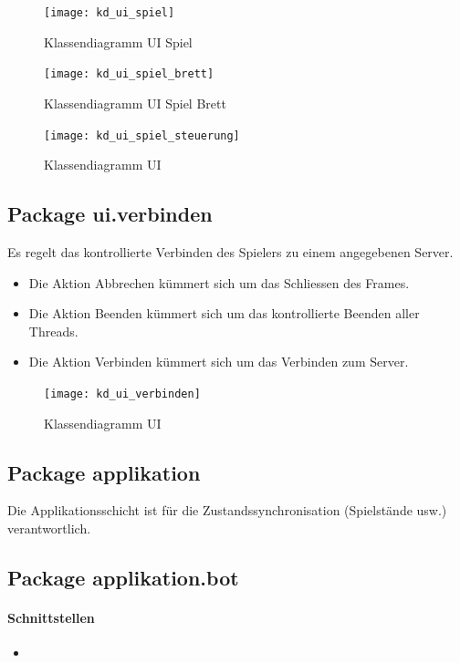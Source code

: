 \documentclass[12pt,halfparskip]{scrartcl}
\begin{document}
\begin{figure}[h]
	\centering
	\texttt{[image: kd\_ui\_spiel]}
	\caption{Klassendiagramm UI Spiel}
	\label{fig:kd_ui_spiel}
\end{figure}

\begin{figure}[h]
	\centering
	\texttt{[image: kd\_ui\_spiel\_brett]}
	\caption{Klassendiagramm UI Spiel Brett}
	\label{fig:kd_ui_spiel_brett}
\end{figure}

\begin{figure}[h]
	\centering
	\texttt{[image: kd\_ui\_spiel\_steuerung]}
	\caption{Klassendiagramm UI}
	\label{fig:kd_ui_spiel_steuerung}
\end{figure}

\subsection{Package ui.verbinden}
Es regelt das kontrollierte Verbinden des Spielers zu einem angegebenen Server.

\begin{itemize}
	\item Die Aktion Abbrechen kümmert sich um das Schliessen des Frames.
	\item Die Aktion Beenden kümmert sich um das kontrollierte Beenden aller Threads.
	\item Die Aktion Verbinden kümmert sich um das Verbinden zum Server.
\end{itemize}

\begin{figure}[h]
	\centering
	\texttt{[image: kd\_ui\_verbinden]}
	\caption{Klassendiagramm UI}
	\label{fig:kd_ui_verbinden}
\end{figure}

\clearpage
\subsection{Package applikation}

Die Applikationsschicht ist für die Zustandssynchronisation (Spielstände usw.) verantwortlich.

\subsection{Package applikation.bot}

	\paragraph{Schnittstellen}
	\begin{itemize}
		\item 
	\end{itemize}
	
\end{document}
